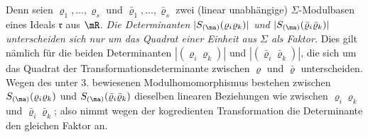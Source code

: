 Denn seien $\varrho_1,\ldots,\varrho_s$ und $\bar\varrho_1,\ldots,\bar\varrho_s$ zwei (linear unabhängige) $\Sigma$-Modulbasen eines Ideals $\mathfrak r$ aus $\mR$. \emph{Die Determinanten $|S_{(\ma)}(\varrho_i\varrho_k)|$ und $|S_{(\ma)}(\bar\varrho_i\bar\varrho_k)|$ unterscheiden sich nur um das Quadrat einer Einheit aus $\Sigma$ als Faktor.} Dies gilt nämlich für die beiden Determinanten $|(\varrho_i\varrho_k)|$ und $|(\bar\varrho_i\bar\varrho_k)|$, die sich um das Quadrat der Transformationsdeterminante zwischen $\varrho$ und $\bar\varrho$ unterscheiden. Wegen des unter 3. bewiesenen Modulhomomorphismus bestehen zwischen $S_{(\ma)}(\varrho_i\varrho_k)$ und $S_{(\ma)}(\bar\varrho_i\bar\varrho_k)$ dieselben linearen Beziehungen wie zwischen $\varrho_i\varrho_k$ und $\bar\varrho_i\bar\varrho_k$; also nimmt wegen der kogredienten Transformation die Determinante den gleichen Faktor an.